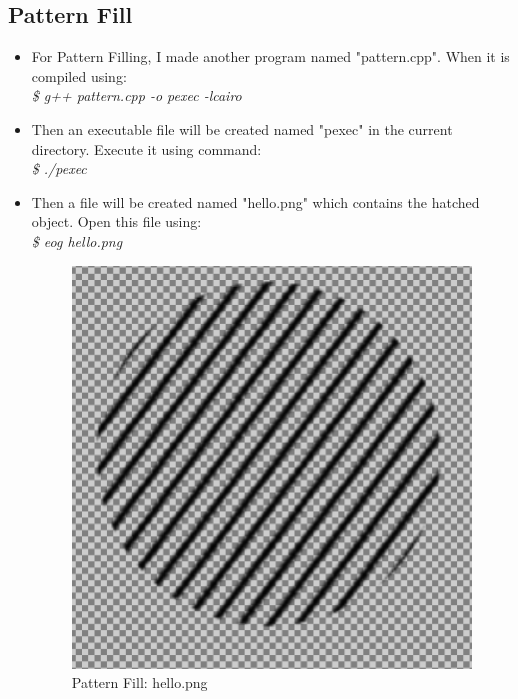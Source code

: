 \subsection{Pattern Fill}
\begin{itemize}
\item For Pattern Filling, I made another program named "pattern.cpp". When it is compiled using:\\
\textit{\$ g++ pattern.cpp -o pexec -lcairo}
\item Then an executable file will be created named "pexec" in the current directory. Execute it using command:\\
\textit{\$ ./pexec}
\item Then a file will be created named "hello.png" which contains the hatched object.
Open this file using: \\
\textit{\$ eog hello.png}
\begin{figure}[!ht]
\centering
\includegraphics[scale=0.7]{images/hatching/pattern.png}                   
\vspace{-1em}
\caption{Pattern Fill: hello.png}
\hspace{-1.5em}
\end{figure}

\end{itemize}